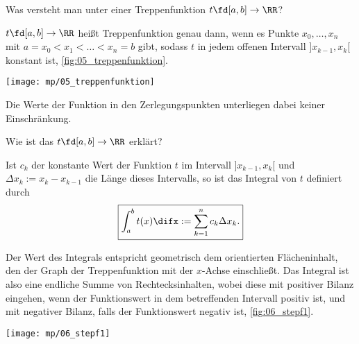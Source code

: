 \begin{frage}\label{06_step}
Was versteht man unter einer Treppenfunktion 
$t \fd [a,b]\to \RR$?
\end{frage}

\begin{antwort}
$t\fd [a,b]\to\RR$ heißt Treppenfunktion genau dann, wenn es 
Punkte $x_0,\ldots,x_n$ mit $a=x_0 < x_1 < \ldots < x_n =b $ gibt, 
sodass $t$ in jedem offenen Intervall $]x_{k-1},x_k[$ konstant ist, 
\sieheAbbildung\ref{fig:05_treppenfunktion}.

\begin{center}
  \texttt{[image: mp/05\_treppenfunktion]}
  \label{fig:05_treppenfunktion}
\end{center}

Die Werte der Funktion in den Zerlegungspunkten unterliegen dabei 
keiner Einschränkung.
\AntEnd
\end{antwort}


\begin{frage}\label{06_stpi}
Wie ist das  $t\fd [a,b]\to\RR$ erklärt? 
\end{frage}

\begin{antwort}
Ist $c_k$ der konstante 
Wert der Funktion $t$ im Intervall $]x_{k-1}, x_k[$ und  
$\Delta x_k := x_k - x_{k-1}$ die Länge dieses Intervalls, so 
ist das Integral von $t$ definiert durch
\begin{equation}\boxed{
\int_a^b t(x)\difx := \sum_{k=1}^n c_k \Delta x_k.}\notag
\end{equation}

Der Wert des Integrals entspricht geometrisch dem orientierten 
Flächeninhalt, den der Graph der Treppenfunktion 
mit der $x$-Achse einschließt. 
Das Integral ist also eine endliche Summe von Rechtecksinhalten, 
wobei diese mit positiver Bilanz eingehen, wenn der Funktionswert 
in dem betreffenden Intervall positiv ist, und mit negativer Bilanz, 
falls der Funktionswert negativ ist, \sieheAbbildung\ref{fig:06_stepf1}. 
\AntEnd

\begin{center}
  \texttt{[image: mp/06\_stepf1]}
  \label{fig:06_stepf1}
\end{center}

\end{antwort}


